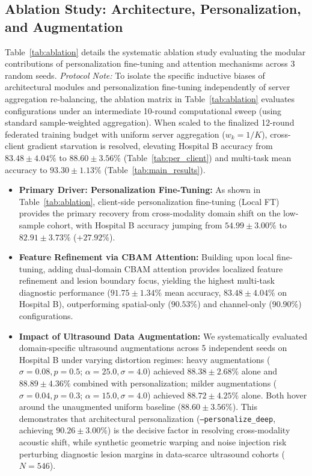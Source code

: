 \documentclass[journal]{IEEEtran}
\begin{document}
\subsection{Ablation Study: Architecture, Personalization, and Augmentation}
Table~\ref{tab:ablation} details the systematic ablation study evaluating the modular contributions of personalization fine-tuning and attention mechanisms across 3 random seeds. \textit{Protocol Note:} To isolate the specific inductive biases of architectural modules and personalization fine-tuning independently of server aggregation re-balancing, the ablation matrix in Table~\ref{tab:ablation} evaluates configurations under an intermediate 10-round computational sweep (using standard sample-weighted aggregation). When scaled to the finalized 12-round federated training budget with uniform server aggregation ($w_k = 1/K$), cross-client gradient starvation is resolved, elevating Hospital B accuracy from $83.48 \pm 4.04\%$ to \textbf{$88.60 \pm 3.56\%$} (Table~\ref{tab:per_client}) and multi-task mean accuracy to \textbf{$93.30 \pm 1.13\%$} (Table~\ref{tab:main_results}).
\begin{itemize}
    \item \textbf{Primary Driver: Personalization Fine-Tuning:} As shown in Table~\ref{tab:ablation}, client-side personalization fine-tuning (Local FT) provides the primary recovery from cross-modality domain shift on the low-sample cohort, with Hospital B accuracy jumping from $54.99 \pm 3.00\%$ to $82.91 \pm 3.73\%$ ($+27.92\%$).
    \item \textbf{Feature Refinement via CBAM Attention:} Building upon local fine-tuning, adding dual-domain CBAM attention provides localized feature refinement and lesion boundary focus, yielding the highest multi-task diagnostic performance ($91.75 \pm 1.34\%$ mean accuracy, $83.48 \pm 4.04\%$ on Hospital B), outperforming spatial-only ($90.53\%$) and channel-only ($90.90\%$) configurations.
    \item \textbf{Impact of Ultrasound Data Augmentation:} We systematically evaluated domain-specific ultrasound augmentations across 5 independent seeds on Hospital B under varying distortion regimes: heavy augmentations ($\sigma=0.08, p=0.5$; $\alpha=25.0, \sigma=4.0$) achieved $88.38 \pm 2.68\%$ alone and $88.89 \pm 4.36\%$ combined with personalization; milder augmentations ($\sigma=0.04, p=0.3$; $\alpha=15.0, \sigma=4.0$) achieved $88.72 \pm 4.25\%$ alone. Both hover around the unaugmented uniform baseline ($88.60 \pm 3.56\%$). This demonstrates that architectural personalization (\texttt{--personalize\_deep}, achieving \textbf{$90.26 \pm 3.00\%$}) is the decisive factor in resolving cross-modality acoustic shift, while synthetic geometric warping and noise injection risk perturbing diagnostic lesion margins in data-scarce ultrasound cohorts ($N=546$).
\end{itemize}
\end{document}

